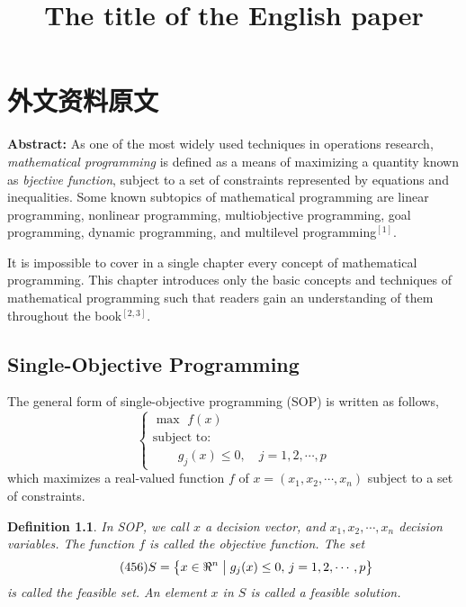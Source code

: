 \chapter{外文资料原文}
\label{cha:engorg}

\title{The title of the English paper}

\textbf{Abstract:} As one of the most widely used techniques in operations
research, \emph{ mathematical programming} is defined as a means of maximizing a
quantity known as \emph{bjective function}, subject to a set of constraints
represented by equations and inequalities. Some known subtopics of mathematical
programming are linear programming, nonlinear programming, multiobjective
programming, goal programming, dynamic programming, and multilevel
programming$^{[1]}$.

It is impossible to cover in a single chapter every concept of mathematical
programming. This chapter introduces only the basic concepts and techniques of
mathematical programming such that readers gain an understanding of them
throughout the book$^{[2,3]}$.


\section{Single-Objective Programming}
The general form of single-objective programming (SOP) is written
as follows,
\begin{equation}\tag*{(123)} %
\left\{\begin{array}{l}
\max \,\,f(x)\\[0.1 cm]
\mbox{subject to:} \\ [0.1 cm]
\qquad g_j(x)\le 0,\quad j=1,2,\cdots,p
\end{array}\right.
\end{equation}
which maximizes a real-valued function $f$ of
$x=(x_1,x_2,\cdots,x_n)$ subject to a set of constraints.

\newtheorem{mpdef}{Definition}[chapter]
\begin{mpdef}
In SOP, we call $x$ a decision vector, and
$x_1,x_2,\cdots,x_n$ decision variables. The function
$f$ is called the objective function. The set
\begin{equation}\tag*{(456)} %
S=\left\{x\in\Re^n\bigm|g_j(x)\le 0,\,j=1,2,\cdots,p\right\}
\end{equation}
is called the feasible set. An element $x$ in $S$ is called a
feasible solution.
\end{mpdef}

